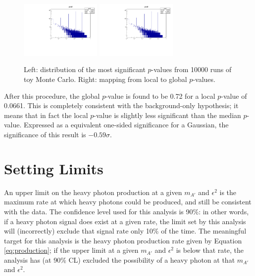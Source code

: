 \begin{figure}[ht]
\begin{center}
    \includegraphics[width=0.35\textwidth,page=1,angle=-90]{vertexing/figs/trials}
    \includegraphics[width=0.35\textwidth,page=6,angle=-90]{vertexing/figs/trials}
\end{center}
\caption{Left: distribution of the most significant $p$-values from 10000 runs of toy Monte Carlo. Right: mapping from local to global $p$-values.}
    \label{fig:trials}
\end{figure}

After this procedure, the global $p$-value is found to be 0.72 for a local $p$-value of 0.0661.
This is completely consistent with the background-only hypothesis; it means that in fact the local $p$-value is slightly less significant than the median $p$-value.
Expressed as a equivalent one-sided significance for a Gaussian, the significance of this result is $-0.59\sigma$.

\clearpage
\section{Setting Limits}
\label{sec:limits}
An upper limit on the heavy photon production at a given $m_{A'}$ and $\epsilon^2$ is the maximum rate at which heavy photons could be produced, and still be consistent with the data.
The confidence level used for this analysis is 90\%: in other words, if a heavy photon signal does exist at a given rate, the limit set by this analysis will (incorrectly) exclude that signal rate only 10\% of the time.
The meaningful target for this analysis is the heavy photon production rate given by Equation \ref{eq:production}; if the upper limit at a given $m_{A'}$ and $\epsilon^2$ is below that rate, the analysis has (at 90\% CL) excluded the possibility of a heavy photon at that $m_{A'}$ and $\epsilon^2$.

